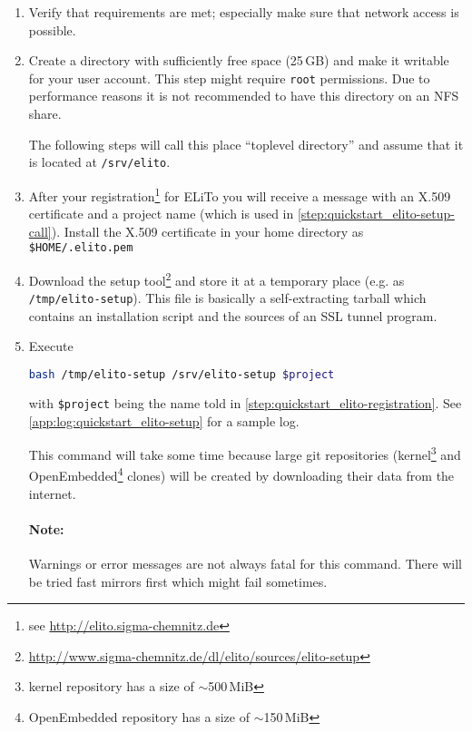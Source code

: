 \begin{enumerate}
\item Verify that requirements are met; especially make sure that
  network access is possible.
\item Create a directory with sufficiently free space (25\,GB) and make
  it writable for your user account.  This step might require
  \texttt{root} permissions.  Due to performance reasons it is not
  recommended to have this directory on an NFS share.

  The following steps will call this place ``toplevel directory''
  and assume that it is located at \texttt{/srv/elito}.
\item\label{step:quickstart_elito-registration} After your
  registration\footnote{see \url{http://elito.sigma-chemnitz.de}} for
  ELiTo you will receive a message with an X.509 certificate and a
  project name (which is used in
  \autoref{step:quickstart_elito-setup-call}).  Install the X.509
  certificate in your home directory as \texttt{\$HOME/.elito.pem}
\item Download the setup
  tool\footnote{\url{http://www.sigma-chemnitz.de/dl/elito/sources/elito-setup}}
  and store it at a temporary place (e.g. as
  \texttt{/tmp/elito-setup}).  This file is basically a
  self-extracting tarball which contains an installation script and
  the sources of an SSL tunnel program.
\item\label{step:quickstart_elito-setup-call} Execute
\begin{lstlisting}[language=bash]
bash /tmp/elito-setup /srv/elito-setup $project
\end{lstlisting}%
  with \texttt{\$project} being the name told in
  \autoref{step:quickstart_elito-registration}. See
  \autoref{app:log:quickstart_elito-setup} for a sample log.

  This command will take some time because large git repositories
  (kernel\footnote{kernel repository has a size of $\sim$500\,MiB} and
  OpenEmbedded\footnote{OpenEmbedded repository has a size of
    $\sim$150\,MiB} clones) will be created by downloading their data
  from the internet.

  \paragraph{Note:} Warnings or error messages are not always fatal for
  this command.  There will be tried fast mirrors first which might
  fail sometimes.
\end{enumerate}


